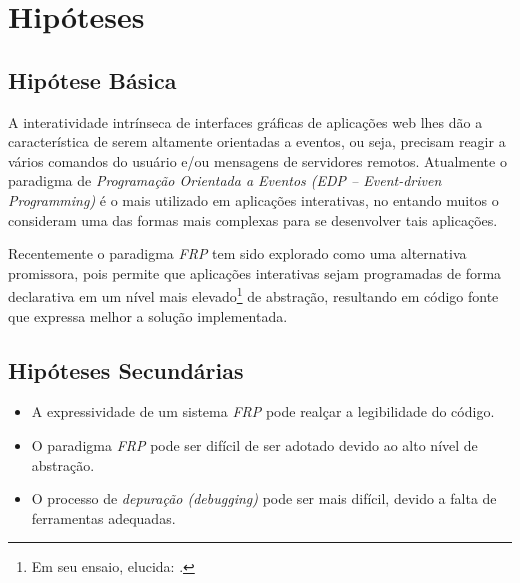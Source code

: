 \section{Hipóteses}\label{lhipoteses}


\subsection{Hipótese Básica}

A interatividade intrínseca de interfaces gráficas de
aplicações web lhes dão a característica de serem altamente
orientadas a eventos,
ou seja, precisam reagir a vários comandos do usuário e/ou
mensagens de servidores remotos.
Atualmente o paradigma de \emph{Programação Orientada a
Eventos (EDP -- Event-driven Programming)} é o mais utilizado em
aplicações interativas, no entando muitos o consideram uma
das formas mais complexas para se desenvolver tais aplicações.

Recentemente o paradigma \emph{FRP} tem sido explorado como
uma alternativa promissora, pois permite que aplicações
interativas sejam programadas de forma declarativa em um
nível mais elevado\footnote{
  Em seu ensaio,  elucida:
  .
}
de abstração, resultando em código fonte que expressa melhor a
solução implementada.


\subsection{Hipóteses Secundárias}

\begin{itemize}[noitemsep]
  \item A expressividade de um sistema \emph{FRP} pode
        realçar a legibilidade do código.
  \item O paradigma \emph{FRP} pode ser difícil de ser adotado
        devido ao alto nível de abstração.
  \item O processo de \emph{depuração (debugging)} pode ser mais difícil,
        devido a falta de ferramentas adequadas.
\end{itemize}

